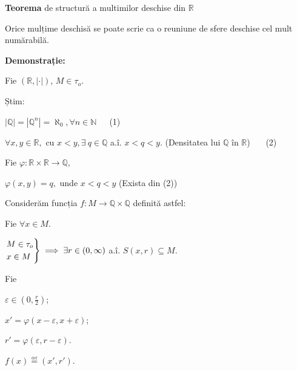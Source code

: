 \documentclass[11pt]{article}
\date{}
\title{}
\begin{document}
\textbf{Teorema} de structură a multimilor deschise din $\mathbb{R}$
\vspace{7}

Orice mulțime deschisă se poate scrie ca o reuniune de sfere deschise cel mult numărabilă.

\vspace{7}
\textbf{Demonstrație:}
\vspace{7}

Fie $(\mathbb{R}, |\cdot|)$, $M \in \tau_o $.

Știm:

$| \mathbb{Q} | = | \mathbb{Q}^n | =\aleph_0, \forall n \in \mathbb{N}$\ \ \ (1)

$\forall x, y \in \mathbb{R},$ cu $x < y, \exists\ q \in \mathbb{Q}$ a.î. $x < q < y.$ (Densitatea lui $\mathbb{Q}$ în $\mathbb{R}$) \ \ \ (2)

\vspace{7}

Fie
$\varphi : \mathbb{R} \times \mathbb{R} \to \mathbb{Q}$,

$\varphi(x, y) = q, $ unde $x < q < y$ (Exista din (2))

\vspace{7}

Considerăm funcția $f : M \to \mathbb{Q} \times \mathbb{Q} $ definită astfel:

Fie $\forall x \in M$.

$\begin{rcases}
M \in \tau_o \\
x \in M
\end{rcases}
\implies \exists r \in (0, \infty)$ a.î. $S(x, r) \subseteq M$.

\vspace{7}
Fie

$\varepsilon \in \left(0, \frac{r}{2}\right)$;

$x' = \varphi\left(x - \varepsilon, x + \varepsilon\right)$;

$r' = \varphi\left(\varepsilon, r-\varepsilon \right)$.

$f(x) \overset{\underset{\mathrm{def}}{}}{=} (x', r')$.
\end{document}
